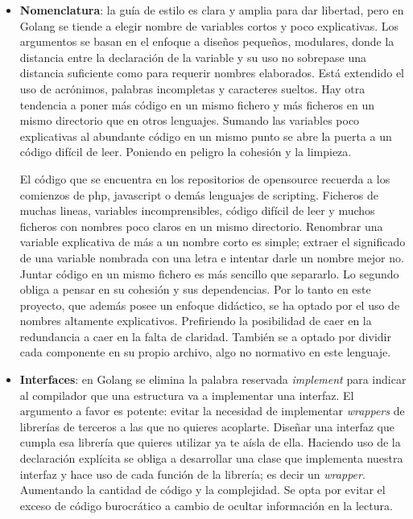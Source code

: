 \begin{itemize}
    \item \textbf{Nomenclatura}: la guía de estilo es clara y amplia para dar libertad, pero en Golang se tiende a elegir nombre de variables cortos y poco explicativas.
    Los argumentos se basan en el enfoque a diseños pequeños, modulares, donde la distancia entre la declaración de la variable y su uso no sobrepase una distancia suficiente como para requerir nombres elaborados.
    Está extendido el uso de acrónimos, palabras incompletas y caracteres sueltos.
    Hay otra tendencia a poner más código en un mismo fichero y más ficheros en un mismo directorio que en otros lenguajes.
    Sumando las variables poco explicativas al abundante código en un mismo punto se abre la puerta a un código difícil de leer.
    Poniendo en peligro la cohesión y la limpieza.

    El código que se encuentra en los repositorios de opensource recuerda a los comienzos de php, javascript o demás lenguajes de scripting.
    Ficheros de muchas lineas, variables incomprensibles, código difícil de leer y muchos ficheros con nombres poco claros en un mismo directorio.
    Renombrar una variable explicativa de más a un nombre corto es simple;
    extraer el significado de una variable nombrada con una letra e intentar darle un nombre mejor no.
    Juntar código en un mismo fichero es más sencillo que separarlo.
    Lo segundo obliga a pensar en su cohesión y sus dependencias.
    Por lo tanto en este proyecto, que además posee un enfoque didáctico, se ha optado por el uso de nombres altamente explicativos.
    Prefiriendo la posibilidad de caer en la redundancia a caer en la falta de claridad.
    También se a optado por dividir cada componente en su propio archivo, algo no normativo en este lenguaje.

    \item \textbf{Interfaces}: en Golang se elimina la palabra reservada \textit{implement} para indicar al compilador que una estructura va a implementar una interfaz.
    El argumento a favor es potente: evitar la necesidad de implementar \textit{wrappers} de librerías de terceros a las que no quieres acoplarte.
    Diseñar una interfaz que cumpla esa librería que quieres utilizar ya te aísla de ella.
    Haciendo uso de la declaración explícita se obliga a desarrollar una clase que implementa nuestra interfaz y hace uso de cada función de la librería;
    es decir un \textit{wrapper}.
    Aumentando la cantidad de código y la complejidad.
    Se opta por evitar el exceso de código burocrático a cambio de ocultar información en la lectura.


\end{itemize}
